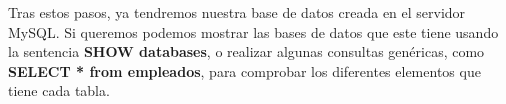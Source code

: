 Tras estos pasos, ya tendremos nuestra base de datos creada en el servidor MySQL. Si queremos podemos mostrar las bases de datos que este tiene usando la sentencia \textbf{SHOW databases}, o realizar algunas consultas genéricas, como \textbf{SELECT * from empleados}, para comprobar los diferentes elementos que tiene cada tabla.



\glsaddall
\printglossaries


\newpage
{}



